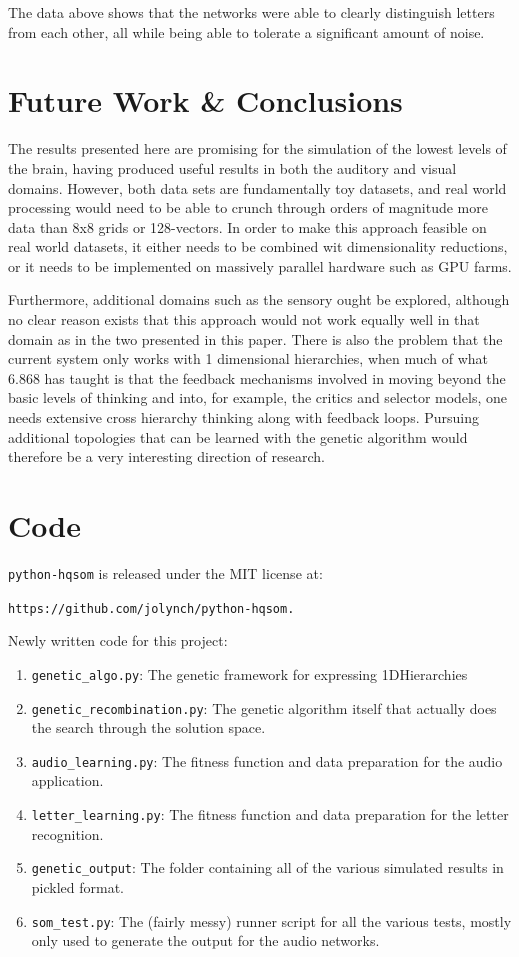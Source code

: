 \documentclass[12pt,a4paper]{article}
\begin{document}
The data above shows that the networks were able to clearly distinguish letters from each other, all while being able to tolerate a significant amount of noise.

\section{Future Work \& Conclusions}
The results presented here are promising for the simulation of the lowest levels of the brain, having produced useful results in both the auditory and visual domains.  However, both data sets are fundamentally toy datasets, and real world processing would need to be able to crunch through orders of magnitude more data than 8x8 grids or 128-vectors.  In order to make this approach feasible on real world datasets, it either needs to be combined wit dimensionality reductions, or it needs to be implemented on massively parallel hardware such as GPU farms.

Furthermore, additional domains such as the sensory ought be explored, although no clear reason exists that this approach would not work equally well in that domain as in the two presented in this paper.  There is also the problem that the current system only works with 1 dimensional hierarchies, when much of what 6.868 has taught is that the feedback mechanisms involved in moving beyond the basic levels of thinking and into, for example, the critics and selector models, one needs extensive cross hierarchy thinking along with feedback loops.  Pursuing additional topologies that can be learned with the genetic algorithm would therefore be a very interesting direction of research.

\section{Code}
\texttt{python-hqsom} is released under the MIT license at:

\texttt{https://github.com/jolynch/python-hqsom.}


Newly written code for this project:
\begin{enumerate}
\item \texttt{genetic\_algo.py}: The genetic framework for expressing 1DHierarchies
\item \texttt{genetic\_recombination.py}: The genetic algorithm itself that actually does the search through the solution space.
\item \texttt{audio\_learning.py}: The fitness function and data preparation for the audio application.
\item \texttt{letter\_learning.py}: The fitness function and data preparation for the letter recognition.
\item \texttt{genetic\_output}: The folder containing all of the various simulated results in pickled format.
\item \texttt{som\_test.py}: The (fairly messy) runner script for all the various tests, mostly only used to generate the output for the audio networks.
\end{enumerate}
\end{document}

